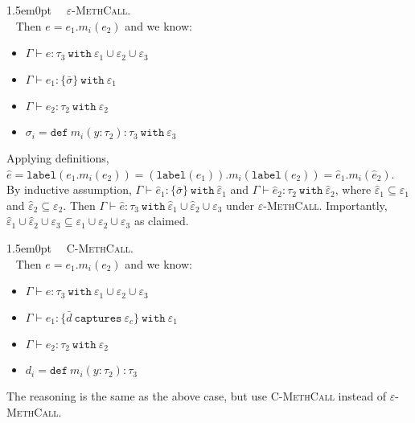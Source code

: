 \documentclass{llncs}
\newcommand{\keywadj}[1]{\mathtt{#1}}
\newcommand{\keyw}[1]{\keywadj{#1}~}
\newcommand{\proofcase}[2]{
	\begin{adjustwidth}{1.5em}{0pt}
		\fbox{Case.}~~#1. \\ ~#2
	\end{adjustwidth}
}
\newcommand{\type}[2]{
	#1~\keyw{with} #2
}
\begin{document}
{\proofcase{\textsc{$\varepsilon$-MethCall}} {
Then $e = e_1.m_i(e_2)$ and we know:
\begin{itemize}
	\item $\Gamma \vdash e : \type{\tau_3}{\varepsilon_1 \cup \varepsilon_2 \cup \varepsilon_3}$
	\item $\Gamma \vdash e_1 : \{ \bar \sigma \}~\keyw{with} \varepsilon_1$
	\item $\Gamma \vdash e_2 : \type{\tau_2}{\varepsilon_2}$
	\item $\sigma_i = \keyw{def} m_i(y : \tau_2) : \tau_3~\keyw{with} \varepsilon_3$ 
\end{itemize}
Applying definitions, $\hat e = \keywadj{label}(e_1.m_i(e_2)) = (\keywadj{label}(e_1)).m_i(\keywadj{label}(e_2)) = \hat e_1.m_i(\hat e_2)$. By inductive assumption, $\Gamma \vdash \hat e_1 : \{ \bar \sigma \}~\keyw{with} \hat \varepsilon_1$ and $\Gamma \vdash \hat e_2 : \type{\tau_2}{\hat \varepsilon_2}$, where $\hat \varepsilon_1 \subseteq \varepsilon_1$ and $\hat \varepsilon_2 \subseteq \varepsilon_2$. Then $\Gamma \vdash \hat e : \tau_3~\keyw{with} \hat \varepsilon_1 \cup \hat \varepsilon_2 \cup \varepsilon_3$ under \textsc{$\varepsilon$-MethCall}. Importantly, $\hat \varepsilon_1 \cup \hat \varepsilon_2 \cup \varepsilon_3 \subseteq \varepsilon_1 \cup \varepsilon_2 \cup \varepsilon_3$ as claimed.\\
}


\proofcase{\textsc{C-MethCall}} {
Then $e = e_1.m_i(e_2)$ and we know:
\begin{itemize}
	\item $\Gamma \vdash e : \type{\tau_3}{\varepsilon_1 \cup \varepsilon_2 \cup \varepsilon_3}$
	\item $\Gamma \vdash e_1 : \{ \bar d~\keyw{captures} \varepsilon_c \}~\keyw{with} \varepsilon_1$
	\item $\Gamma \vdash e_2 : \type{\tau_2}{\varepsilon_2}$
	\item $d_i = \keyw{def} m_i(y : \tau_2) : \tau_3$ 
\end{itemize}
The reasoning is the same as the above case, but use \textsc{C-MethCall} instead of \textsc{$\varepsilon$-MethCall}.\\
}

}
\end{document}
